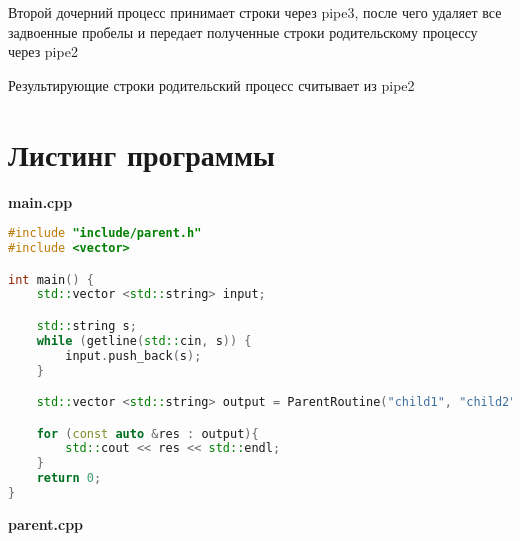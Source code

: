 \documentclass[pdf, unicode, 12pt, a4paper,oneside,fleqn]{article}
\begin{document}
Второй дочерний процесс принимает строки через pipe3, после чего удаляет все задвоенные пробелы и передает полученные строки родительскому процессу через pipe2

Результирующие строки родительский процесс считывает из pipe2

\section{Листинг программы}

{\large\textbf{main.cpp}}

\begin{lstlisting}[language=C++]
#include "include/parent.h"
#include <vector>

int main() {
    std::vector <std::string> input;

    std::string s;
    while (getline(std::cin, s)) {
        input.push_back(s);
    }

    std::vector <std::string> output = ParentRoutine("child1", "child2", input);

    for (const auto &res : output){
        std::cout << res << std::endl;
    }
    return 0;
}

\end{lstlisting}

{\large\textbf{parent.cpp}}
\end{document}
